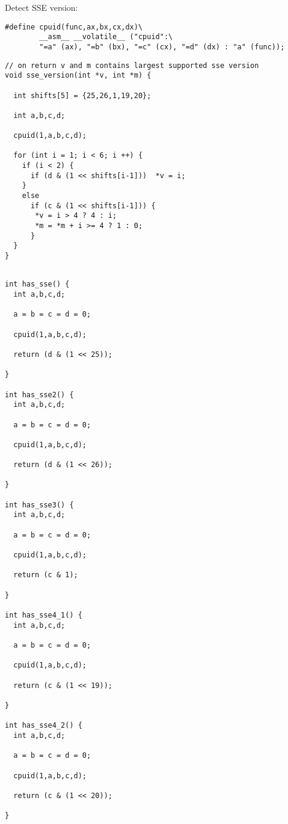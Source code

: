 \documentclass[12pt]{article}
\begin{document}
Detect SSE version: 

\begin{small}
\begin{verbatim}
#define cpuid(func,ax,bx,cx,dx)\
        __asm__ __volatile__ ("cpuid":\
        "=a" (ax), "=b" (bx), "=c" (cx), "=d" (dx) : "a" (func));
\end{verbatim}
\end{small}

\begin{small}
\begin{verbatim}
// on return v and m contains largest supported sse version
void sse_version(int *v, int *m) {
  
  int shifts[5] = {25,26,1,19,20}; 
  
  int a,b,c,d; 
  
  cpuid(1,a,b,c,d); 

  for (int i = 1; i < 6; i ++) {
    if (i < 2) { 
      if (d & (1 << shifts[i-1]))  *v = i; 
    }
    else
      if (c & (1 << shifts[i-1])) {
       *v = i > 4 ? 4 : i; 
       *m = *m + i >= 4 ? 1 : 0;
      }
  }
}
\end{verbatim}
\end{small}

\begin{small}
\begin{verbatim}

int has_sse() {
  int a,b,c,d; 

  a = b = c = d = 0; 
  
  cpuid(1,a,b,c,d); 
  
  return (d & (1 << 25));
  
}

int has_sse2() {
  int a,b,c,d; 

  a = b = c = d = 0; 
  
  cpuid(1,a,b,c,d); 
  
  return (d & (1 << 26));
  
}

int has_sse3() {
  int a,b,c,d; 

  a = b = c = d = 0; 
  
  cpuid(1,a,b,c,d); 
  
  return (c & 1);
  
}

int has_sse4_1() {
  int a,b,c,d; 

  a = b = c = d = 0; 
  
  cpuid(1,a,b,c,d); 
  
  return (c & (1 << 19));
  
}

int has_sse4_2() {
  int a,b,c,d; 

  a = b = c = d = 0; 
  
  cpuid(1,a,b,c,d); 
  
  return (c & (1 << 20));
  
}


\end{verbatim}
\end{small}
\end{document}

